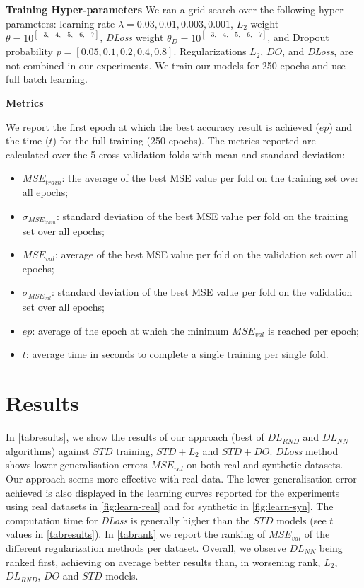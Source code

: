 \documentclass{article}
\begin{document}
\textbf{Training Hyper-parameters}
We ran a grid search over the following hyper-parameters: learning rate $\lambda = 0.03,0.01,0.003,0.001$, $L_2$ weight $\theta = 10^{[-3,-4,-5,-6,-7]}$, \emph{DLoss} weight $\theta_{D} = 10^{[-3,-4,-5,-6,-7]}$, and Dropout probability $p = [0.05,0.1,0.2,0.4,0.8]$.
Regularizations $L_2$, $DO$, and \emph{DLoss}, are not combined in our experiments. 
We train our models for 250 epochs and use full batch learning. 

\textbf{Metrics}

We report the first epoch at which the best accuracy result is achieved ($ep$) and the time ($t$) for the full training (250 epochs).
The metrics reported are calculated over the 5 cross-validation folds with mean and standard deviation: 
\begin{itemize}
 \item \textbf{$MSE_{train}$}: the average of the best MSE value per fold on the training set over all epochs;
 \item \textbf{$\sigma_{{MSE}_{train}}$}: standard deviation of the best MSE value per fold on the training set over all epochs;
 \item \textbf{$MSE_{val}$}: average of the best MSE value per fold on the validation set over all epochs;
 \item \textbf{$\sigma_{{MSE}_{val}}$}: standard deviation of the best MSE value per fold on the validation set over all epochs;
 \item \textbf{$ep$}: average of the epoch at which the minimum $MSE_{val}$ is reached per epoch;
 \item \textbf{$t$}: average time in seconds to complete a single training per single fold.
\end{itemize}



\section{Results}\label{sec:results}

In \autoref{tabresults}, we show the results of our approach (best of $DL_{RND}$ and $DL_{NN}$ algorithms) against $STD$ training, $STD+L_2$ and $STD+DO$. 
\emph{DLoss} method shows lower generalisation errors $MSE_{val}$ on both real and synthetic datasets.
Our approach seems more effective with real data.
The lower generalisation error achieved is also displayed in the learning curves reported for the experiments using real datasets in \autoref{fig:learn-real} and for synthetic in \autoref{fig:learn-syn}.
The computation time for \emph{DLoss} is generally higher than the $STD$ models (see $t$ values in \autoref{tabresults}).
In \autoref{tabrank} we report the ranking of $MSE_{val}$ of the different regularization methods per dataset.
Overall, we observe $DL_{NN}$ being ranked first, achieving on average better results than, in worsening rank, $L_2$, $DL_{RND}$, $DO$ and $STD$ models. 
\end{document}
